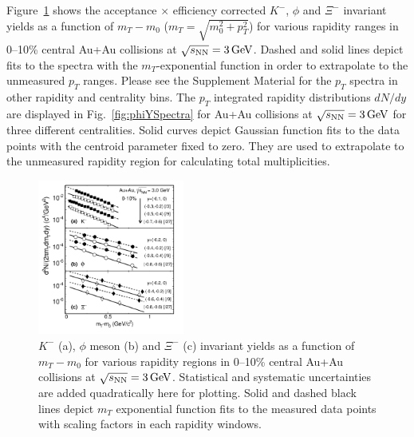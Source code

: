 \documentclass[aps,tightenlines,superscriptaddress,twocolumn]{revtex4-1}
\begin{document}
Figure~\ref{fig:phimTSpectra} shows the acceptance $\times$ efficiency corrected $K^-$, $\phi$ and $\Xi^-$ invariant yields as a function of $m_T-m_0$ ($m_T = \sqrt{m_{0}^{2}+p_{T}^2}$) for various rapidity ranges in 0--10\% central Au+Au collisions at ${\sqrt{s_{\rm NN}} = \rm{3\,GeV}}$. 
Dashed and solid lines depict fits to the spectra with the $m_T$-exponential function in order to extrapolate to the unmeasured $p_T$ ranges. Please see the Supplement Material for the $p_T$ spectra in other rapidity and centrality bins.
The $p_T$ integrated rapidity distributions $dN/dy$ are displayed in Fig.~\ref{fig:phiYSpectra} for Au+Au collisions at ${\sqrt{s_{\rm NN}} = \rm{3\,GeV}}$ for three different centralities. 
Solid curves depict Gaussian function fits to the data points with the centroid parameter fixed to zero. They are used to extrapolate to the unmeasured rapidity region for calculating total multiplicities.


\begin{figure}
\centering
\hspace*{-4mm}
\includegraphics[width=0.43\textwidth]{fig2_mT_spectra-eps-converted-to.pdf}
  \caption{$K^-$ (a), $\phi$ meson (b) and $\Xi^-$ (c) invariant yields as a function of $m_T-m_0$ for various rapidity regions in 0--10\% central Au+Au collisions at ${\sqrt{s_{\rm NN}} = \rm{3\,GeV}}$. Statistical and systematic uncertainties are added quadratically here for plotting. Solid and dashed black lines depict $m_T$ exponential function fits to the measured data points with scaling factors in each rapidity windows.}
\label{fig:phimTSpectra} 
\end{figure}
\end{document}
